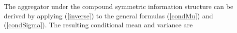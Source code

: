 \documentclass[11pt]{article}
\theoremstyle{definition}
\theoremstyle{definition}
\begin{document}
The aggregator under the compound symmetric information structure can be derived by applying (\ref{inverse}) to the general formulas (\ref{condMu}) and (\ref{condSigma}). The resulting conditional mean and variance are 
%
\end{document}
